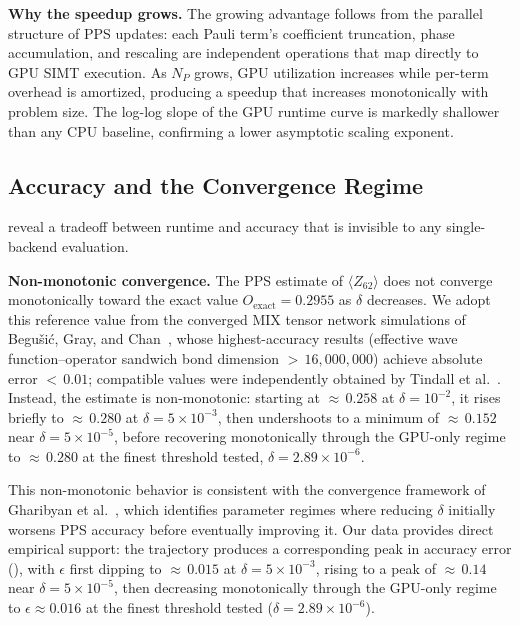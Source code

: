 \documentclass[conference,10pt]{IEEEtran}
\begin{document}
\textbf{Why the speedup grows.} The growing advantage follows from the parallel structure of PPS updates: each Pauli term's coefficient truncation, phase accumulation, and rescaling are independent operations that map directly to GPU SIMT execution. As $N_P$ grows, GPU utilization increases while per-term overhead is amortized, producing a speedup that increases monotonically with problem size. The log-log slope of the GPU runtime curve is markedly shallower than any CPU baseline, confirming a lower asymptotic scaling exponent.
 
\subsection{Accuracy and the Convergence Regime}
\label{sec:pps-accuracy}
 
 reveal a tradeoff between runtime and accuracy that is invisible to any single-backend evaluation.
 
\textbf{Non-monotonic convergence.} The PPS estimate of $\langle Z_{62} \rangle$ does not converge monotonically toward the exact value $O_{\mathrm{exact}} = 0.2955$ as $\delta$ decreases. We adopt this reference value from the converged MIX tensor network simulations of Begu\v{s}i\'{c}, Gray, and Chan~\cite{begusic2024converged}, whose highest-accuracy results (effective wave function--operator sandwich bond dimension ${>}\,16{,}000{,}000$) achieve absolute error ${<}\,0.01$; compatible values were independently obtained by Tindall et al.~\cite{tindall2024efficient}. Instead, the estimate is non-monotonic: starting at ${\approx}\,0.258$ at $\delta = 10^{-2}$, it rises briefly to ${\approx}\,0.280$ at $\delta = 5\times10^{-3}$, then undershoots to a minimum of ${\approx}\,0.152$ near $\delta = 5\times10^{-5}$, before recovering monotonically through the GPU-only regime to ${\approx}\,0.280$ at the finest threshold tested, $\delta = 2.89\times10^{-6}$.
 
This non-monotonic behavior is consistent with the convergence framework of Gharibyan et al.~\cite{gharibyan2025practical}, which identifies parameter regimes where reducing $\delta$ initially worsens PPS accuracy before eventually improving it. Our data provides direct empirical support: the trajectory produces a corresponding peak in accuracy error (), with $\epsilon$ first dipping to ${\approx}\,0.015$ at $\delta = 5\times10^{-3}$, rising to a peak of ${\approx}\,0.14$ near $\delta = 5\times10^{-5}$, then decreasing monotonically through the GPU-only regime to $\epsilon \approx 0.016$ at the finest threshold tested ($\delta = 2.89\times10^{-6}$).
 
\end{document}
